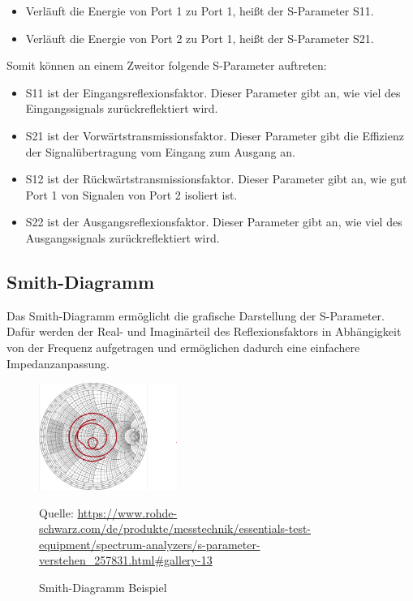 \begin{itemize}
    \item Verläuft die Energie von Port 1 zu Port 1, heißt der S-Parameter S11.
    \item Verläuft die Energie von Port 2 zu Port 1, heißt der S-Parameter S21.
\end{itemize}
Somit können an einem Zweitor folgende S-Parameter auftreten:
\begin{itemize}
    \item S11 ist der Eingangsreflexionsfaktor. Dieser Parameter gibt an, wie viel des Eingangssignals zurückreflektiert wird.
    \item S21 ist der Vorwärtstransmissionsfaktor. Dieser Parameter gibt die Effizienz der Signalübertragung vom Eingang zum Ausgang an.
    \item S12 ist der Rückwärtstransmissionsfaktor. Dieser Parameter gibt an, wie gut Port 1 von Signalen von Port 2 isoliert ist.
    \item S22 ist der Ausgangsreflexionsfaktor. Dieser Parameter gibt an, wie viel des Ausgangssignals zurückreflektiert wird.
\end{itemize}

\subsection{Smith-Diagramm}
Das Smith-Diagramm ermöglicht die grafische Darstellung der S-Parameter.
Dafür werden der Real- und Imaginärteil des Reflexionsfaktors in Abhängigkeit von der Frequenz
aufgetragen und ermöglichen dadurch eine einfachere Impedanzanpassung.
\begin{figure}[h]
    \centering
    \includegraphics[width=0.4\textwidth]{Pictures/SmithDiagram.png}
    \caption{Smith-Diagramm Beispiel}
    \footnotesize{Quelle: \url{https://www.rohde-schwarz.com/de/produkte/messtechnik/essentials-test-equipment/spectrum-analyzers/s-parameter-verstehen_257831.html#gallery-13}}
\end{figure}

\clearpage